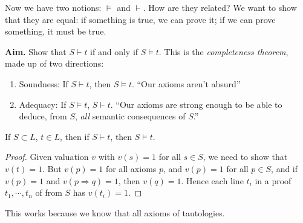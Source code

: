 \documentclass[a4paper]{article}
\begin{document}
Now we have two notions: $\models$ and $\vdash$. How are they related? We want to show that they are equal: if something is true, we can prove it; if we can prove something, it must be true.

\noindent\textbf{Aim.} Show that $S\vdash t$ if and only if $S\models t$.
This is the \emph{completeness theorem}, made up of two directions:
\begin{enumerate}
  \item Soundness: If $S\vdash t$, then $S\models t$. ``Our axioms aren't absurd''
  \item Adequacy: If $S\models t$, $S\vdash t$.  ``Our axioms are strong enough to be able to deduce, from $S$, \emph{all} semantic consequences of $S$.''
\end{enumerate}

\begin{prop}[Soundness]
  If $S\subset L$, $t\in L$, then if $S\vdash t$, then $S\models t$.
\end{prop}

\begin{proof}
  Given valuation $v$ with $v(s) = 1$ for all $s\in S$, we need to show that $v(t) = 1$. But $v(p) = 1$ for all axioms $p$, and $v(p) = 1$ for all $p\in S$, and if $v(p) = 1$ and $v(p\Rightarrow q) = 1$, then $v(q) = 1$. Hence each line $t_i$ in a proof $t_1, \cdots, t_n$ of from $S$ has $v(t_i) = 1$. 
\end{proof}
This works because we know that all axioms of tautologies. 
\end{document}

